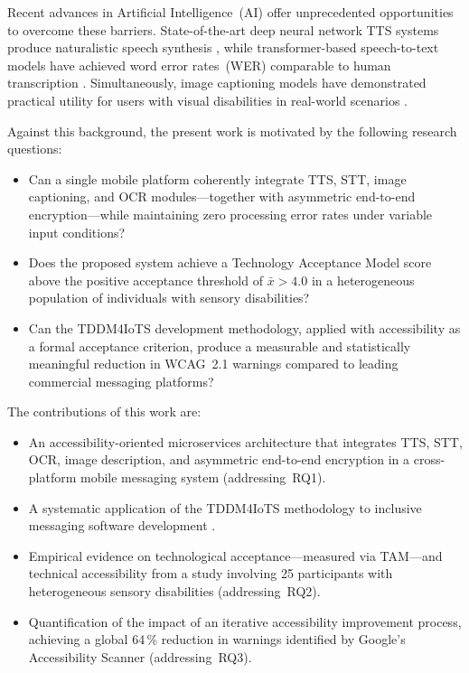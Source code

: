 \documentclass[journal]{IEEEtran}
\begin{document}
	Recent advances in Artificial Intelligence~(AI) offer
	unprecedented opportunities to overcome these barriers.
	State-of-the-art deep neural network TTS systems produce
	naturalistic speech synthesis \cite{tan2021}, while
	transformer-based speech-to-text models have achieved
	word error rates~(WER) comparable to human
	transcription \cite{baevski2020}.
	Simultaneously, image captioning models have demonstrated
	practical utility for users with visual disabilities in
	real-world scenarios \cite{dognin2021}.
	
	Against this background, the present work is motivated by the
	following research questions:
	\begin{itemize}
		\item[\textbf{RQ1}] Can a single mobile platform coherently
		integrate TTS, STT, image captioning, and OCR modules---together
		with asymmetric end-to-end encryption---while maintaining zero
		processing error rates under variable input conditions?
		\item[\textbf{RQ2}] Does the proposed system achieve a
		Technology Acceptance Model score above the positive acceptance
		threshold of $\bar{x}{>}4.0$ in a heterogeneous population of
		individuals with sensory disabilities?
		\item[\textbf{RQ3}] Can the TDDM4IoTS development methodology,
		applied with accessibility as a formal acceptance criterion,
		produce a measurable and statistically meaningful reduction in
		WCAG~2.1 warnings compared to leading commercial messaging
		platforms?
	\end{itemize}
	
	The contributions of this work are:
	\begin{itemize}
		\item An accessibility-oriented microservices architecture that
		integrates TTS, STT, OCR, image description, and asymmetric
		end-to-end encryption in a cross-platform mobile messaging system
		(addressing~RQ1).
		\item A systematic application of the TDDM4IoTS methodology to
		inclusive messaging software development \cite{guerrero2020}.
		\item Empirical evidence on technological acceptance---measured via
		TAM---and technical accessibility from a study involving 25
		participants with heterogeneous sensory disabilities (addressing~RQ2).
		\item Quantification of the impact of an iterative accessibility
		improvement process, achieving a global 64\,\% reduction in
		warnings identified by Google's Accessibility Scanner
		(addressing~RQ3).
	\end{itemize}
	
\end{document}
